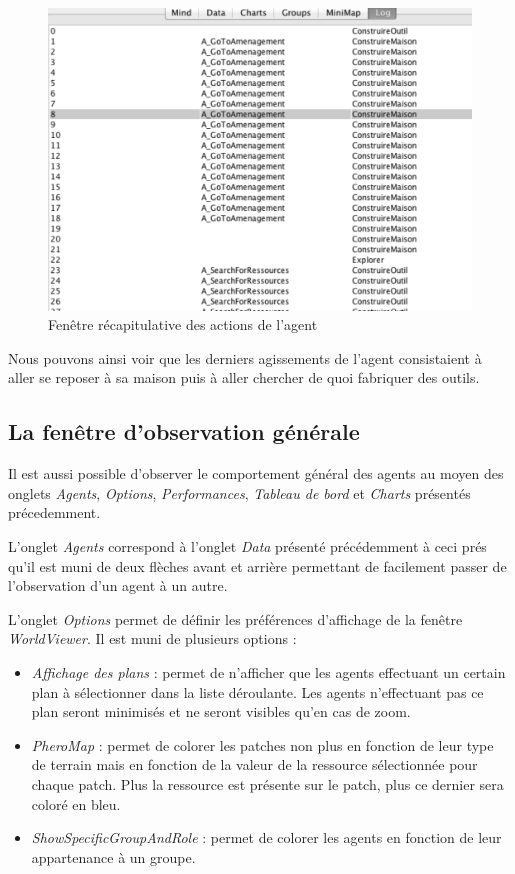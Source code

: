 \begin{figure}[!ht]
\begin{center}
\includegraphics[scale=0.5]{DocumentationSimulation/observe4.pdf}
\caption[observe]{Fenêtre récapitulative des actions de l'agent \\}
\label{observe4}
\end{center}
\end{figure} 

Nous pouvons ainsi voir que les derniers agissements de l'agent consistaient à aller se reposer à sa maison puis à aller chercher de quoi fabriquer des outils.


\subsection{La fenêtre d'observation générale}

Il est aussi possible d'observer le comportement général des agents au moyen des onglets \textit{Agents}, \textit{Options}, \textit{Performances}, \textit{Tableau de bord} et \textit{Charts} présentés précedemment.

L'onglet \textit{Agents} correspond à l'onglet \textit{Data} présenté précédemment à ceci prés qu'il est muni de deux flèches avant et arrière permettant de facilement passer de l'observation d'un agent à un autre.

L'onglet \textit{Options} permet de définir les préférences d'affichage de la fenêtre \textit{WorldViewer}. Il est muni de plusieurs options :
\begin{itemize}
\item \textit{Affichage des plans} : permet de n'afficher que les agents effectuant un certain plan à sélectionner dans la liste déroulante. Les agents n'effectuant pas ce plan seront minimisés et ne seront visibles qu'en cas de zoom.
\item \textit{PheroMap} : permet de colorer les patches non plus en fonction de leur type de terrain mais en fonction de la valeur de la ressource sélectionnée pour chaque patch. Plus la ressource est présente sur le patch, plus ce dernier sera coloré en bleu.
\item \textit{ShowSpecificGroupAndRole} : permet de colorer les agents en fonction de leur appartenance à un groupe.
\end{itemize}

